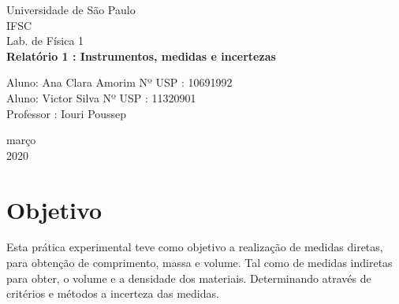 \documentclass[a4paper, 12pt]{article}
\begin{document}

\begin{titlepage}
	\begin{center}
	

		\Huge{Universidade de São Paulo}\\
		\large{IFSC}\\ 
		\large{Lab. de Física 1}\\ 
		\vspace{15pt}
        \vspace{95pt}
        \textbf{\LARGE{Relatório 1 : Instrumentos, medidas e incertezas }}\\
		\vspace{3,5cm}
	\end{center}
	
	\begin{flushleft}
		\begin{tabbing}
			Aluno: Ana Clara Amorim  Nº USP : 10691992 \\
			Aluno: Victor Silva  Nº USP : 11320901\\
			Professor : Iouri Poussep \\
	\end{tabbing}
 \end{flushleft}
	\vspace{1cm}
	
	\begin{center}
		\vspace{\fill}
			 março\\
		 2020
			\end{center}
\end{titlepage}
\newpage
{}
\section{Objetivo}
Esta prática experimental teve como objetivo a realização de medidas diretas, para obtenção de comprimento, massa e volume. Tal como de medidas indiretas para obter, o volume e a densidade dos materiais. Determinando através de critérios e métodos a incerteza das medidas.
\end{document}
